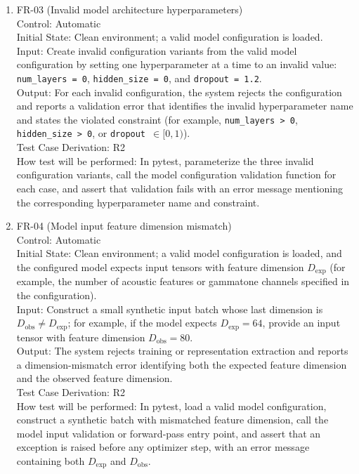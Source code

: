 \documentclass[12pt, titlepage]{article}
\begin{document}
\begin{enumerate}
\item{FR-03 (Invalid model architecture hyperparameters)\\}
Control: Automatic \\
Initial State: Clean environment; a valid model configuration is loaded. \\
Input: Create invalid configuration variants from the valid model configuration
by setting one hyperparameter at a time to an invalid value:
\texttt{num\_layers = 0}, \texttt{hidden\_size = 0}, and
\texttt{dropout = 1.2}. \\
Output: For each invalid configuration, the system rejects the configuration
and reports a validation error that identifies the invalid hyperparameter name
and states the violated constraint (for example,
\texttt{num\_layers > 0}, \texttt{hidden\_size > 0}, or
\texttt{dropout \(\in [0,1)\)}). \\
Test Case Derivation: R2 \\
How test will be performed: In pytest, parameterize the three invalid
configuration variants, call the model configuration validation function for
each case, and assert that validation fails with an error message mentioning the
corresponding hyperparameter name and constraint.

\item{FR-04 (Model input feature dimension mismatch)\\}
Control: Automatic \\
Initial State: Clean environment; a valid model configuration is loaded, and the configured model expects input tensors with feature dimension $D_{\mathrm{exp}}$ (for example, the number of acoustic features or gammatone channels specified in the configuration). \\
Input: Construct a small synthetic input batch whose last dimension is
$D_{\mathrm{obs}} \neq D_{\mathrm{exp}}$; for example, if the model expects
$D_{\mathrm{exp}} = 64$, provide an input tensor with feature dimension
$D_{\mathrm{obs}} = 80$. \\
Output: The system rejects training or representation extraction and reports a dimension-mismatch error identifying both the expected feature dimension and the observed feature dimension. \\
Test Case Derivation: R2 \\
How test will be performed: In pytest, load a valid model configuration,
construct a synthetic batch with mismatched feature dimension, call the model input validation or forward-pass entry point, and assert that an exception is raised before any optimizer step, with an error message containing both $D_{\mathrm{exp}}$ and $D_{\mathrm{obs}}$.



\end{enumerate}
\end{document}

